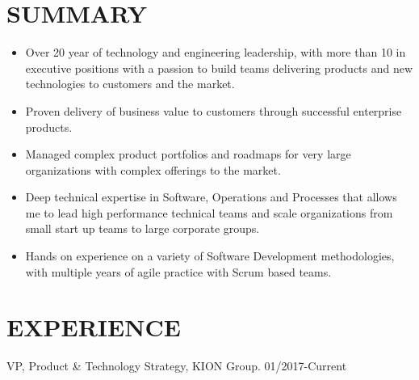 \documentclass{res}
\begin{document}
\thispagestyle{empty} %


\address{51 Roslyn Avenue\\San Carlos, Ca, 94070}
\address{+1.650.489.0329\\jmpicnic@gmail.com\\www.linkedin.com/in/mpinilla}

\begin{resume}

\section{SUMMARY}

\begin{itemize}
\item Over 20 year of technology and engineering leadership, with more than 10 in executive positions with a passion to build teams delivering products and new technologies to customers and the market.
\item Proven delivery of business value to customers through successful enterprise products.
\item Managed complex product portfolios and roadmaps for very large organizations with complex offerings to the market.
\item Deep technical expertise in Software, Operations and Processes that allows me to lead high performance technical teams and scale organizations from small start up teams to large corporate groups.
\item Hands on experience on a variety of Software Development methodologies, with multiple years of agile practice with Scrum based teams.
\end{itemize}


\section{EXPERIENCE}

\begin{bf}
VP, Product \& Technology Strategy, KION Group. 01/2017-Current
\end{bf}


\end{resume}
\end{document}
